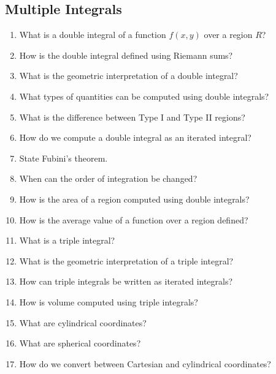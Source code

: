 \subsection*{Multiple Integrals}

\begin{enumerate}

\item What is a double integral of a function $f(x,y)$ over a region $R$?

\item How is the double integral defined using Riemann sums?

\item What is the geometric interpretation of a double integral?

\item What types of quantities can be computed using double integrals?

\item What is the difference between Type I and Type II regions?

\item How do we compute a double integral as an iterated integral?

\item State Fubini's theorem.

\item When can the order of integration be changed?

\item How is the area of a region computed using double integrals?

\item How is the average value of a function over a region defined?

\item What is a triple integral?

\item What is the geometric interpretation of a triple integral?

\item How can triple integrals be written as iterated integrals?

\item How is volume computed using triple integrals?

\item What are cylindrical coordinates?

\item What are spherical coordinates?

\item How do we convert between Cartesian and cylindrical coordinates?


\end{enumerate}
